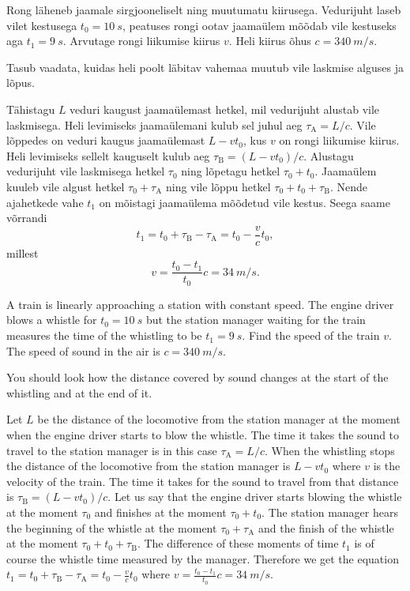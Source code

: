 
Rong läheneb jaamale sirgjooneliselt ning muutumatu kiirusega. Vedurijuht laseb vilet kestusega $t_0=\SI{10}{s}$, peatuses rongi ootav jaamaülem mõõdab vile kestuseks aga $t_1=\SI{9}{s}$. Arvutage rongi liikumise kiirus $v$. Heli kiirus õhus $c=\SI{340}{m/s}$.

\hint
Tasub vaadata, kuidas heli poolt läbitav vahemaa muutub vile laskmise alguses ja lõpus.

\solu
Tähistagu $L$ veduri kaugust jaamaülemast hetkel, mil vedurijuht alustab vile laskmisega. Heli levimiseks jaamaülemani kulub sel juhul aeg $\tau_\text{A}=L/c$. Vile lõppedes on veduri kaugus jaamaülemast $L-vt_0$, kus $v$ on rongi liikumise kiirus. Heli levimiseks sellelt kauguselt kulub aeg $\tau_\text{B}=(L-vt_0)/c$. Alustagu vedurijuht vile laskmisega hetkel $\tau_0$ ning lõpetagu hetkel $\tau_0+t_0$. Jaamaülem kuuleb vile algust hetkel $\tau_0+\tau_\text{A}$ ning vile lõppu hetkel $\tau_0+t_0+\tau_\text{B}$. Nende ajahetkede vahe $t_1$ on mõistagi jaamaülema mõõdetud vile kestus. Seega saame võrrandi
\[
t_1 = t_0+\tau_\text{B}-\tau_\text{A} = t_0 - \frac{v}{c}t_0,
\]
millest
\[
v = \frac{t_0-t_1}{t_0}c = \SI{34}{m/s}.
\]

A train is linearly approaching a station with constant speed. The engine driver blows a whistle for $t_0=\SI{10}{s}$ but the station manager waiting for the train measures the time of the whistling to be $t_1=\SI{9}{s}$. Find the speed of the train $v$. The speed of sound in the air is $c=\SI{340}{m/s}$.

\hinteng
You should look how the distance covered by sound changes at the start of the whistling and at the end of it.

\solueng
Let $L$ be the distance of the locomotive from the station manager at the moment when the engine driver starts to blow the whistle. The time it takes the sound to travel to the station manager is in this case $\tau_\text{A}=L/c$. When the whistling stops the distance of the locomotive from the station manager is $L-vt_0$ where $v$ is the velocity of the train. The time it takes for the sound to travel from that distance is $\tau_\text{B}=(L-vt_0)/c$. Let us say that the engine driver starts blowing the whistle at the moment $\tau_0$ and finishes at the moment $\tau_0+t_0$. The station manager hears the beginning of the whistle at the moment $\tau_0+\tau_\text{A}$ and the finish of the whistle at the moment $\tau_0+t_0+\tau_\text{B}$. The difference of these moments of time $t_1$ is of course the whistle time measured by the manager. Therefore we get the equation $t_1 = t_0+\tau_\text{B}-\tau_\text{A} = t_0 - \frac{v}{c}t_0$ where $v = \frac{t_0-t_1}{t_0}c = \SI{34}{m/s}$.
\probend